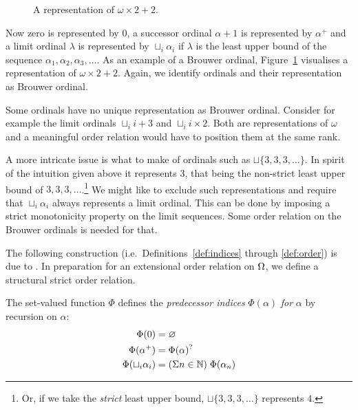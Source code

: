 \begin{figure}
\begin{center}
\begin{tikzpicture}

\end{tikzpicture}
\end{center}
\caption{A representation of $\omega \times 2 + 2$.}\label{fig:brouwer}
\end{figure}

Now zero is represented by $0$, a successor ordinal $\alpha +1$ is represented
by $\alpha^+$ and a limit ordinal $\lambda$ is represented by $\sqcup_i
\alpha_i$ if $\lambda$ is the least upper bound of the sequence $\alpha_1,
\alpha_2, \alpha_3, \ldots$. As an example of a Brouwer ordinal,
Figure~\ref{fig:brouwer} visualises a representation of $\omega \times
2 + 2$. Again, we identify ordinals and their representation as
Brouwer ordinal.

Some ordinals have no unique representation as Brouwer ordinal. Consider for
example the limit ordinals $\sqcup_i i + 3$ and $\sqcup_i i \times 2$. Both
are representations of $\omega$ and a meaningful order relation would
have to position them at the same rank.

A more intricate issue is what to make of ordinals such as $\sqcup \{
3, 3, 3, \ldots \}$. In spirit of the intuition given above it
represents $3$, that being the non-strict least upper bound of $3, 3,
3, \ldots$.\footnote{Or, if we take the \emph{strict} least upper bound, $\sqcup \{
3, 3, 3, \ldots \}$ represents $4$.}
We might like to exclude such representations and require that
$\sqcup_i \alpha_i$ always represents a limit ordinal. This can be
done by imposing a strict monotonicity property on the limit
sequences. Some order relation on the Brouwer ordinals is needed for
that.

The following construction (i.e.\ Definitions~\ref{def:indices}
through \ref{def:order}) is due to \citet{hancock-08}. In preparation
for an extensional order relation on $\Ord$, we define a structural
strict order relation.

\begin{definition}\label{def:indices}%
The set-valued function $\Phi$ defines the \emph{predecessor indices}
$\Phi(\alpha)$ \emph{for} $\alpha$ by recursion on $\alpha$:
\begin{align*}
  \Phi(0)                 &= \nothing \\
  \Phi(\alpha^+)          &= \Phi(\alpha)^? \\
  \Phi(\sqcup_i \alpha_i) &= (\Sigma n \in \mathbb{N}) \; \Phi(\alpha_n)
\end{align*}
\end{definition}

